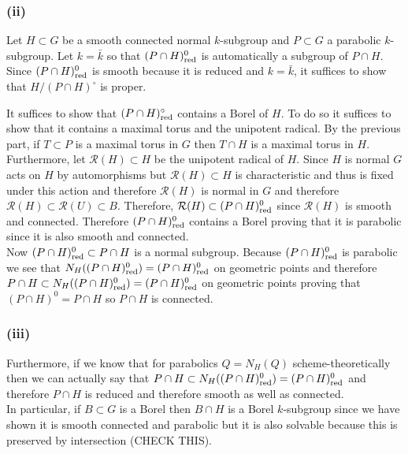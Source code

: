 \documentclass[12pt]{article}
\begin{document}
\subsubsection{(ii)}

\newcommand{\R}{\mathcal{R}}

Let $H \subset G$ be a smooth connected normal $k$-subgroup and $P \subset G$ a parabolic $k$-subgroup. Let $k = \bar{k}$ so that $(P \cap H)^0_{\mathrm{red}}$ is automatically a subgroup of $P \cap H$. Since $(P \cap H)^0_{\mathrm{red}}$ is smooth because it is reduced and $k = \bar{k}$, it suffices to show that $H / (P \cap H)^\circ$ is proper.


It suffices to show that $(P \cap H)^\circ_{\mathrm{red}}$ contains a Borel of $H$. To do so it suffices to show that it contains a maximal torus and the unipotent radical. By the previous part, if $T \subset P$ is a maximal torus in $G$ then $T \cap H$ is a maximal torus in $H$. Furthermore, let $\R(H) \subset H$ be the unipotent radical of $H$. Since $H$ is normal $G$ acts on $H$ by automorphisms but $\R(H) \subset H$ is characteristic and thus is fixed under this action and therefore $\R(H)$ is normal in $G$ and therefore $\R(H) \subset \R(U) \subset B$. Therefore, $\R(H) \subset (P \cap H)^0_{\red}$ since $\R(H)$ is smooth and connected. Therefore $(P \cap H)^0_{\mathrm{red}}$ contains a Borel proving that it is parabolic since it is also smooth and connected.
\bigskip\\
Now $(P \cap H)^0_{\mathrm{red}} \subset P \cap H$ is a normal subgroup. Because $(P \cap H)^0_{\mathrm{red}}$ is parabolic we see that $N_{H}((P \cap H)^0_{\mathrm{red}}) = (P \cap H)^0_{\mathrm{red}}$ on geometric points and therefore $P \cap H \subset N_{H}((P \cap H)^0_{\mathrm{red}}) = (P \cap H)^0_{\mathrm{red}}$ on geometric points proving that $(P \cap H)^0 = P \cap H$ so $P \cap H$ is connected. 

\subsubsection{(iii)}

Furthermore, if we know that for parabolics $Q = N_H(Q)$ scheme-theoretically then we can actually say that $P \cap H \subset N_{H}((P \cap H)^0_{\mathrm{red}}) = (P \cap H)^0_{\mathrm{red}}$ and therefore $P \cap H$ is reduced and therefore smooth as well as connected. 
\bigskip\\
In particular, if $B \subset G$ is a Borel then $B \cap H$ is a Borel $k$-subgroup since we have shown it is smooth connected and parabolic but it is also solvable because this is preserved by intersection (CHECK THIS). 
\end{document}
